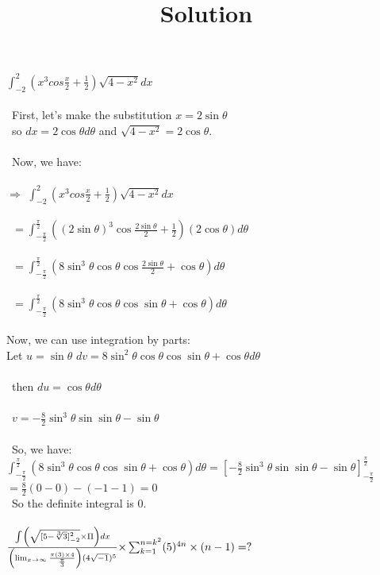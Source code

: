 \documentclass{article}
\title{Solution}
\begin{document}
$\int_{-2}^{2}\left( x^{3}cos\frac{x}{2}+\frac{1}{2} \right)\sqrt{4-x^{2}}dx$\\\\\
First, let's make the substitution $x = 2\sin{\theta}$\\\ 
so $dx =2\cos{\theta}d\theta$ and $\sqrt{4-x^2} = 2\cos{\theta}$.\\\\\
Now, we have:\\\\
$\Longrightarrow$ 
$\int_{-2}^{2}\left( x^{3}cos\frac{x}{2}+\frac{1}{2} \right)\sqrt{4-x^{2}}dx$  \\\\\ 
$= \int_{-\frac{\pi}{2}}^{\frac{\pi}{2}}\left( (2\sin{\theta})^{3}\cos\frac{2\sin{\theta}}{2}+\frac{1}{2} \right)(2\cos{\theta})d\theta$ \\\\\ 
$=\int_{-\frac{\pi}{2}}^{\frac{\pi}{2}}\left( 8\sin^{3}{\theta}\cos{\theta}\cos\frac{2\sin{\theta}}{2}+\cos{\theta} \right)d\theta$\\\\\ 
$=\int_{-\frac{\pi}{2}}^{\frac{\pi}{2}}\left( 8\sin^{3}{\theta}\cos{\theta}\cos\sin{\theta}+\cos{\theta} \right)d\theta$\\\\
Now, we can use integration by parts:\\
Let $u = \sin{\theta}$
$dv = 8\sin^{2}{\theta}\cos{\theta}\cos\sin{\theta} + \cos{\theta}d\theta$\\\\\ 
then $du = \cos{\theta}d\theta$\\\\\ 
$v = -\frac{8}{2}\sin^{3}{\theta}\sin\sin{\theta} - \sin{\theta}$\\\\\ 
So, we have:
$\int_{-\frac{\pi}{2}}^{\frac{\pi}{2}}\left( 8\sin^{3}{\theta}\cos{\theta}\cos\sin{\theta}+\cos{\theta} \right)d\theta = [-\frac{8}{2}\sin^{3}{\theta}\sin\sin{\theta} - \sin{\theta}]_{-\frac{\pi}{2}}^{\frac{\pi}{2}}$
$=\frac{8}{2}(0-0) - (-1-1) = 0$\\\
So the definite integral is 0.\\\\

$\frac{\int_{}^{} \left(\sqrt{[5-\sqrt[3]{3}]^{2}_{-2}}\times  \Pi \right)dx}
{\left( \lim_{x \to \infty}\frac{\pi(3) \space \times\space 4}{\frac{\pi}{3}} \right)(4\sqrt{-1})^{5}}\space{\times }\sum_{k=1}^{n=k^{2}} (5)^{4n}\times (n-1)=?$
\end{document}
